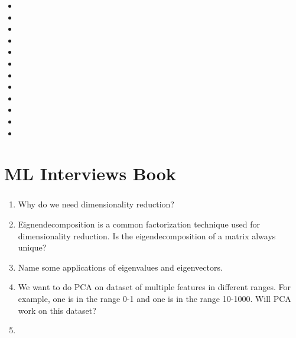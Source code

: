 \documentclass[a4paper]{article}
\newcommand{\cmark}{\ding{51}}%
\newcommand{\done}{\rlap{$\square$}{\raisebox{2pt}{\large\hspace{1pt}\cmark}}\hspace{-2.5pt}}
\begin{document}
\begin{itemize}
    \item [\done]
    \item [\done]
    \item [\done]
    \item [\done]
    \item [\done]
    \item [\done]
    \item [\done]
    \item [\done]
    \item [\done]
    \item [\done]
    \item [\done]
    \item [\done]

\end{itemize}
\subsubsection{}


\section{ML Interviews Book}
\subsubsection{}
\begin{enumerate}
    \item Why do we need dimensionality reduction?

    \item Eignendecomposition is a common factorization technique used for dimensionality reduction. Is the eigendecomposition of a matrix always unique?

    \item Name some applications of eigenvalues and eigenvectors.

    \item We want to do PCA on  dataset of multiple features in different ranges. For example, one is in the range 0-1 and one is in the range 10-1000. Will PCA work on this dataset?

    \item


\end{enumerate}

\subsubsection{}
\end{document}
